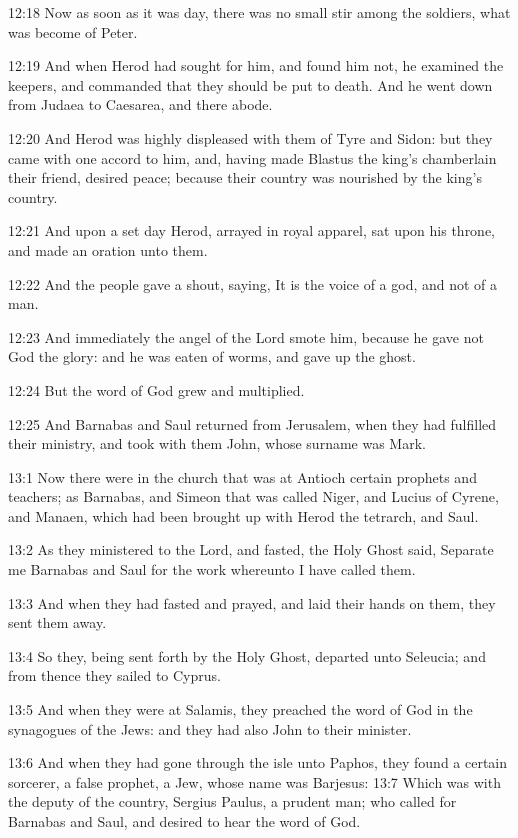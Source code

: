 12:18 Now as soon as it was day, there was no small stir among the soldiers, what was become of Peter.

12:19 And when Herod had sought for him, and found him not, he examined the keepers, and commanded that they should be put to death.  And he went down from Judaea to Caesarea, and there abode.

12:20 And Herod was highly displeased with them of Tyre and Sidon: but they came with one accord to him, and, having made Blastus the king's chamberlain their friend, desired peace; because their country was nourished by the king's country.

12:21 And upon a set day Herod, arrayed in royal apparel, sat upon his throne, and made an oration unto them.

12:22 And the people gave a shout, saying, It is the voice of a god, and not of a man.

12:23 And immediately the angel of the Lord smote him, because he gave not God the glory: and he was eaten of worms, and gave up the ghost.

12:24 But the word of God grew and multiplied.

12:25 And Barnabas and Saul returned from Jerusalem, when they had fulfilled their ministry, and took with them John, whose surname was Mark.

13:1 Now there were in the church that was at Antioch certain prophets and teachers; as Barnabas, and Simeon that was called Niger, and Lucius of Cyrene, and Manaen, which had been brought up with Herod the tetrarch, and Saul.

13:2 As they ministered to the Lord, and fasted, the Holy Ghost said, Separate me Barnabas and Saul for the work whereunto I have called them.

13:3 And when they had fasted and prayed, and laid their hands on them, they sent them away.

13:4 So they, being sent forth by the Holy Ghost, departed unto Seleucia; and from thence they sailed to Cyprus.

13:5 And when they were at Salamis, they preached the word of God in the synagogues of the Jews: and they had also John to their minister.

13:6 And when they had gone through the isle unto Paphos, they found a certain sorcerer, a false prophet, a Jew, whose name was Barjesus: 13:7 Which was with the deputy of the country, Sergius Paulus, a prudent man; who called for Barnabas and Saul, and desired to hear the word of God.


